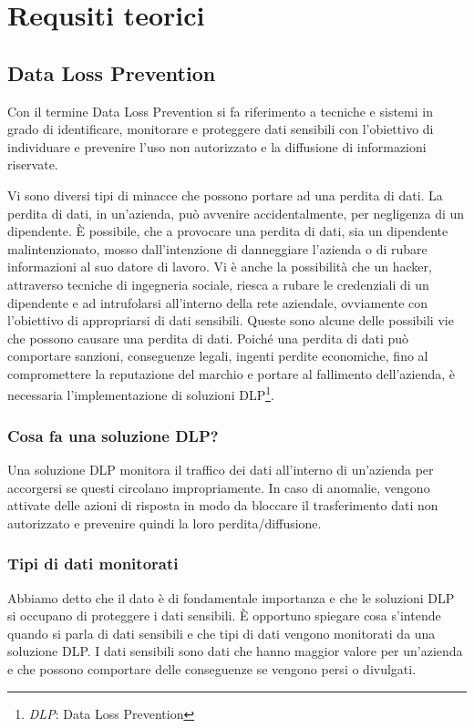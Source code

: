 \chapter{Requsiti teorici}

\section{Data Loss Prevention}
Con il termine Data Loss Prevention si fa riferimento a 
tecniche e sistemi in grado di identificare, monitorare 
e proteggere dati sensibili con l’obiettivo di individuare 
e prevenire l’uso non autorizzato e la diffusione di informazioni riservate. 

Vi sono diversi tipi di minacce che possono portare ad una perdita di dati.
La perdita di dati, in un'azienda, può avvenire accidentalmente, per negligenza di un 
dipendente. È possibile, che a provocare una perdita di dati, sia un dipendente malintenzionato,
mosso dall'intenzione di danneggiare l'azienda o di rubare informazioni al suo datore di lavoro.
Vi è anche la possibilità che un hacker, attraverso tecniche di ingegneria sociale, riesca a rubare
le credenziali di un dipendente e ad intrufolarsi all'interno della rete aziendale, ovviamente con 
l'obiettivo di appropriarsi di dati sensibili.
Queste sono alcune delle possibili vie che possono causare una perdita di dati. Poiché una perdita di dati
può comportare sanzioni, conseguenze legali, ingenti perdite economiche, fino al compromettere la reputazione del 
marchio e portare al fallimento dell'azienda, è necessaria l'implementazione di soluzioni
DLP\footnote{\textit{DLP}: Data Loss Prevention}.
 

\subsection{Cosa fa una soluzione DLP?}
    Una soluzione DLP monitora il traffico dei dati all'interno di un'azienda per accorgersi se
    questi circolano impropriamente. In caso di anomalie, vengono attivate delle azioni di risposta 
    in modo da bloccare il trasferimento dati non autorizzato e prevenire quindi la loro perdita/diffusione.
    \cite{OpenLab}


\subsection{Tipi di dati monitorati\cite{DLP1}}
    Abbiamo detto che il dato è di fondamentale importanza e che le soluzioni DLP si occupano di proteggere i dati sensibili.
    È opportuno spiegare cosa s'intende quando si parla di dati sensibili e che tipi di dati vengono monitorati 
    da una soluzione DLP. I dati sensibili sono dati che hanno maggior valore per un'azienda e che possono comportare 
    delle conseguenze se vengono persi o divulgati.

